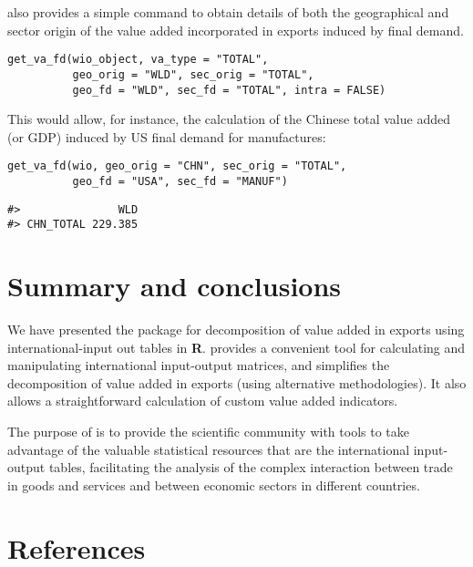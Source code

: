  also provides a simple command to obtain details of both the
geographical and sector origin of the value added incorporated in exports
induced by final demand.

\begin{verbatim}
get_va_fd(wio_object, va_type = "TOTAL",
          geo_orig = "WLD", sec_orig = "TOTAL",
          geo_fd = "WLD", sec_fd = "TOTAL", intra = FALSE)
\end{verbatim}

This would allow, for instance, the calculation of the Chinese
total value added (or GDP) induced by US final demand for manufactures:

\begin{verbatim}
get_va_fd(wio, geo_orig = "CHN", sec_orig = "TOTAL",
          geo_fd = "USA", sec_fd = "MANUF")
\end{verbatim}

\begin{verbatim}
#>               WLD
#> CHN_TOTAL 229.385
\end{verbatim}

\hypertarget{summary-and-conclusions}{%
\section{Summary and conclusions}\label{summary-and-conclusions}}

We have presented the package  for decomposition of value
added in exports using international-input out tables in \textbf{R}.
 provides a convenient tool for calculating and manipulating
international input-output matrices, and simplifies the decomposition of value
added in exports (using alternative methodologies). It also allows a
straightforward calculation of custom value added indicators.

The purpose of  is to provide the scientific community with
tools to take advantage of the valuable statistical resources that are the
international input-output tables, facilitating the analysis of the complex
interaction between trade in goods and services and between economic sectors in
different countries.

\hypertarget{references}{%
\section*{References}\label{references}}

